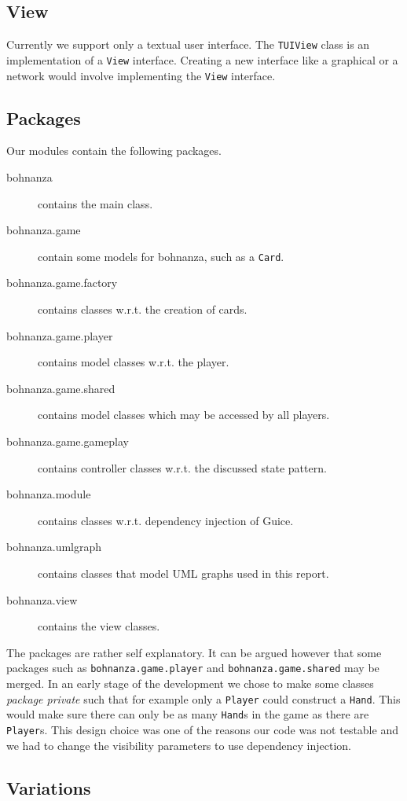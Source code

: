 \subsection{View}
Currently we support only a textual user interface. The \texttt{TUIView} class is an implementation
of a \texttt{View} interface. Creating a new interface like a graphical or a network would involve
implementing the \texttt{View} interface.

\subsection{Packages}
Our modules contain the following packages.
\begin{description}
\item[bohnanza] contains the main class.
\item[bohnanza.game] contain some models for bohnanza, such as a \texttt{Card}.
\item[bohnanza.game.factory] contains classes w.r.t. the creation of cards.
\item[bohnanza.game.player] contains model classes w.r.t. the player.
\item[bohnanza.game.shared] contains model classes which may be accessed by all players.
\item[bohnanza.game.gameplay] contains controller classes w.r.t. the discussed state pattern.
\item[bohnanza.module] contains classes w.r.t. dependency injection of Guice.
\item[bohnanza.umlgraph] contains classes that model UML graphs used in this report.
\item[bohnanza.view] contains the view classes.
\end{description}

The packages are rather self explanatory. It can be argued however that some packages such as \texttt{bohnanza.game.player} and
\texttt{bohnanza.game.shared} may be merged. In an early stage of the development we chose to make some classes \emph{package private} such
that for example only a \texttt{Player} could construct a \texttt{Hand}. This would make sure there can only be as many \texttt{Hand}s in
the game as there are \texttt{Player}s. This design choice was one of the reasons our code was not testable and we had to change the visibility
parameters to use dependency injection.

\subsection{Variations}

